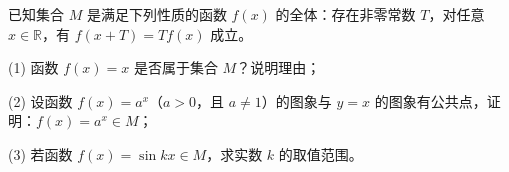 \begin{question}
已知集合 \(M\) 是满足下列性质的函数 \(f(x)\) 的全体：存在非零常数 \(T\)，对任意 \(x\in\mathbb{R}\)，有 \(f(x+T)=Tf(x)\) 成立。

    (1) 函数 \(f(x)=x\) 是否属于集合 \(M\)？说明理由；

    (2) 设函数 \(f(x)=a^x\)（\(a>0\)，且 \(a\ne1\)）的图象与 \(y=x\) 的图象有公共点，证明：\(f(x)=a^x\in M\)；

    (3) 若函数 \(f(x)=\sin kx\in M\)，求实数 \(k\) 的取值范围。

\end{question}
